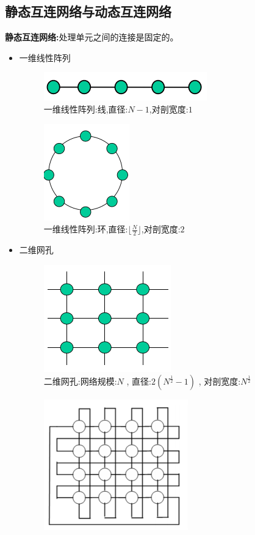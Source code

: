 \documentclass[UTF8,a4paper]{ctexart}
\begin{document}
  \subsection{静态互连网络与动态互连网络}
  \textbf{静态互连网络:}处理单元之间的连接是固定的。
  \begin{itemize}
    \item 一维线性阵列
    \begin{figure}[H]
      \centering
      \includegraphics[scale = 0.3]{assets/ParallelComputing_c8f8c.png}
      \caption{一维线性阵列:线,直径:$N-1$,对剖宽度:$1$}
    \end{figure}
    \begin{figure}[H]
      \centering
      \includegraphics[scale = 0.3]{assets/ParallelComputing_b1923.png}
      \caption{一维线性阵列:环,直径:$\lfloor\frac{N}{2}\rfloor$,对剖宽度:$ 2 $}
    \end{figure}
    \item 二维网孔
    \begin{figure}[H]
      \centering
      \includegraphics[scale = 0.3]{assets/ParallelComputing_ea5ca.png}
      \caption{二维网孔:网络规模:$N$ , 直径:$2(N^{\frac{1}{2}} - 1)$ , 对剖宽度:$N^{\frac{1}{2}}$}
    \end{figure}
    \begin{figure}[H]
      \centering
      \includegraphics[scale = 0.3]{assets/ParallelComputing_5b5f4.png}

\end{figure}
\end{itemize}
\end{document}
